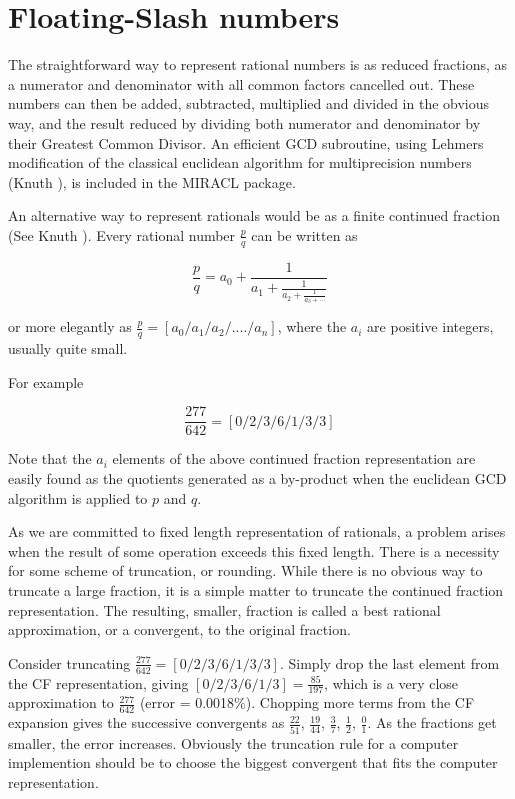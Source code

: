 \cleardoublepage
\chapter{Floating-Slash numbers}

      The  straightforward  way to represent rational numbers is as reduced 
      fractions,  as a numerator and denominator with  all  common  factors 
      cancelled  out.   These  numbers  can  then  be  added,   subtracted, 
      multiplied and divided in the obvious way,  and the result reduced by 
      dividing  both  numerator  and  denominator  by their Greatest Common 
      Divisor.  An efficient GCD subroutine,  using Lehmers modification of 
      the  classical euclidean algorithm for multiprecision numbers (Knuth 
      \cite{Knuth81}), is included in the MIRACL package.  

      An alternative way to  represent  rationals  would  be  as  a  finite 
      continued fraction (See Knuth \cite[\$4.5.2]{Knuth81}). Every rational number 
      $\frac{p}{q}$ can be written as 

$$ \frac{p}{q} = a_0 + \frac{1}{a_1 + \textstyle \frac{1}{a_2 + \textstyle \frac{1}{a_3 + \cdots}}}$$

      or more elegantly as $\frac{p}{q} = [a_0/a_1/a_2/..../a_n]$,  where the
      $a_i$  are positive integers, usually quite small.  

      For example

                      $$\frac{277}{642}  =  [0/2/3/6/1/3/3]$$

      Note  that  the  $a_i$ elements of the  above  continued  fraction 
      representation  are  easily found as the quotients generated as a 
      by-product when the euclidean GCD algorithm is applied to $p$ and $q$.  

      As we are committed to fixed length representation  of  rationals,  a 
      problem  arises  when the result of some operation exceeds this fixed 
      length.  There is a necessity  for  some  scheme  of  truncation,  or 
      rounding. While there is no obvious way to truncate a large fraction, 
      it   is   a   simple   matter  to  truncate  the  continued  fraction 
      representation.  The resulting,  smaller,  fraction is called a  best 
      rational approximation, or a convergent, to the original fraction.  

 Consider truncating $\frac{277}{642} = [0/2/3/6/1/3/3]$. Simply drop the last 
 element from the CF representation,  giving $[0/2/3/6/1/3] = 
 \frac{85}{197}$, 
 which is a very close approximation to $\frac{277}{642}$ (error = 0.0018\%). 
 Chopping  more  terms  from  the  CF  expansion  gives the successive 
 convergents  as  $\frac{22}{51}$,  $\frac{19}{44}$,  
 $\frac{3}{7}$,  $\frac{1}{2}$,  $\frac{0}{1}$.   As  the 
 fractions get smaller, the error increases.  Obviously the truncation 
 rule for a computer implemention  should  be  to  choose  the  biggest 
 convergent that fits the computer representation.  

